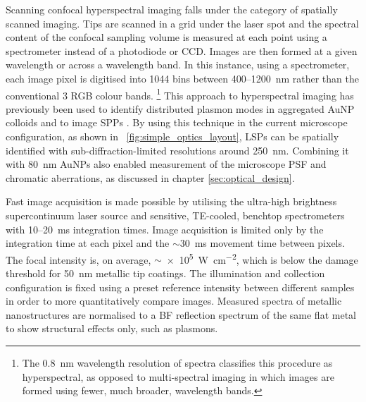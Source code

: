 \documentclass{article}
\begin{document}
Scanning confocal hyperspectral imaging falls under the category of spatially scanned imaging. Tips are scanned in a grid under the laser spot and the spectral content of the confocal sampling volume is measured at each point using a spectrometer instead of a photodiode or CCD. Images are then formed at a given wavelength or across a wavelength band. In this instance, using a spectrometer, each image pixel is digitised into 1044 bins between 400--\SI{1200}{nm} rather than the conventional 3 RGB colour bands.%
\footnote{The \SI{0.8}{nm} wavelength resolution of spectra classifies this procedure as hyperspectral, as opposed to multi-spectral imaging in which images are formed using fewer, much broader, wavelength bands.}
This approach to hyperspectral imaging has previously been used to identify distributed plasmon modes in aggregated AuNP colloids \cite{herrmann2013} and to image SPPs \cite{bashevoy2007hyperspectral}. By using this technique in the current microscope configuration, as shown in \figurename~\ref{fig:simple_optics_layout}, LSPs can be spatially identified with sub-diffraction-limited resolutions around \SI{250}{nm}. Combining it with \SI{80}{nm} AuNPs also enabled measurement of the microscope PSF and chromatic aberrations, as discussed in chapter \ref{sec:optical_design}.

Fast image acquisition is made possible by utilising the ultra-high brightness supercontinuum laser source and sensitive, TE-cooled, benchtop spectrometers with 10--\SI{20}{ms} integration times. Image acquisition is limited only by the integration time at each pixel and the $\sim$\SI{30}{ms} movement time between pixels. The focal intensity is, on average, $\sim$\SI{e5}{\watt\per\centi\metre\squared}, which is below the damage threshold for \SI{50}{nm} metallic tip coatings. The illumination and collection configuration is fixed using a preset reference intensity between different samples in order to more quantitatively compare images. Measured spectra of metallic nanostructures are normalised to a BF reflection spectrum of the same flat metal to show structural effects only, such as plasmons. %
\end{document}
